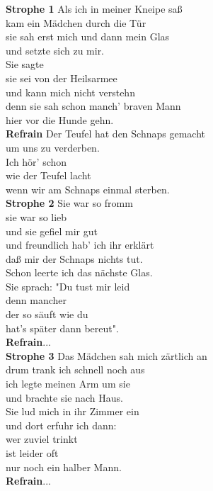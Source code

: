 \documentclass[twoside,8pt]{scrartcl}
\begin{document}
\textbf{Strophe 1}\newline
Als ich in meiner Kneipe saß\\
kam ein Mädchen durch die Tür\\
sie sah erst mich und dann mein Glas\\
und setzte sich zu mir.\\
Sie sagte\\
sie sei von der Heilsarmee\\
und kann mich nicht verstehn\\
denn sie sah schon manch' braven Mann\\
hier vor die Hunde gehn.\\
\newline
\textbf{Refrain}\newline
Der Teufel hat den Schnaps gemacht\\
um uns zu verderben.\\
Ich hör' schon\\
wie der Teufel lacht\\
wenn wir am Schnaps einmal sterben.\\
%
\newline
\textbf{Strophe 2}
\newline
Sie war so fromm\\
sie war so lieb\\
und sie gefiel mir gut\\
und freundlich hab' ich ihr erklärt\\
daß mir der Schnaps nichts tut.\\
Schon leerte ich das nächste Glas.\\
Sie sprach: "Du tust mir leid\\
denn mancher\\
der so säuft wie du\\
hat's später dann bereut".\\
\newline
\textbf{Refrain}...\\
%
\clearpage
\textbf{Strophe 3}
\newline
Das Mädchen sah mich zärtlich an\\
drum trank ich schnell noch aus\\
ich legte meinen Arm um sie\\
und brachte sie nach Haus.\\
Sie lud mich in ihr Zimmer ein\\
und dort erfuhr ich dann:\\
wer zuviel trinkt\\
ist leider oft\\
nur noch ein halber Mann.\\
\newline
\textbf{Refrain}...
\end{document}
